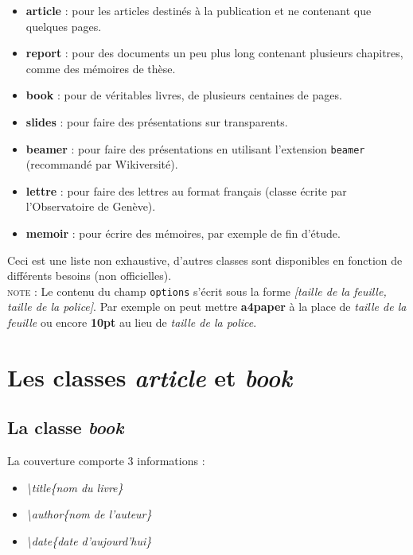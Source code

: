 \documentclass[a4paper, 10pt]{book}
\begin{document}
\begin{itemize}
\item \textbf{article} : pour les articles destinés à la publication et ne contenant que quelques pages.
\item \textbf{report} : pour des documents un peu plus long contenant plusieurs chapitres, comme des mémoires de thèse.
\item \textbf{book} : pour de véritables livres, de plusieurs centaines de pages.
\item \textbf{slides} : pour faire des présentations sur transparents.
\item \textbf{beamer} : pour faire des présentations en utilisant l'extension \texttt{beamer} (recommandé par Wikiversité).
\item \textbf{lettre} : pour faire des lettres au format français (classe écrite par l'Observatoire de Genève).
\item \textbf{memoir} : pour écrire des mémoires, par exemple de fin d'étude.
\end{itemize}
Ceci est une liste non exhaustive, d'autres classes sont disponibles en fonction de différents besoins (non officielles).\\

\textsc{note :} Le contenu du champ \texttt{options} s'écrit sous la forme \textit{[taille de la feuille, taille de la police]}. Par exemple on peut mettre \textbf{a4paper} à la place de \textit{taille de la feuille} ou encore \textbf{10pt} au lieu de \textit{taille de la police}.

\section{Les classes \textit{article} et \textit{book}}
\subsection{La classe \textit{book}}

La couverture comporte 3 informations :

\begin{itemize}
\item \textit{\textbackslash title\{nom du livre\}}
\item \textit{\textbackslash author\{nom de l'auteur\}}
\item \textit{\textbackslash date\{date d'aujourd'hui\}}\\
\end{itemize}
\end{document}
